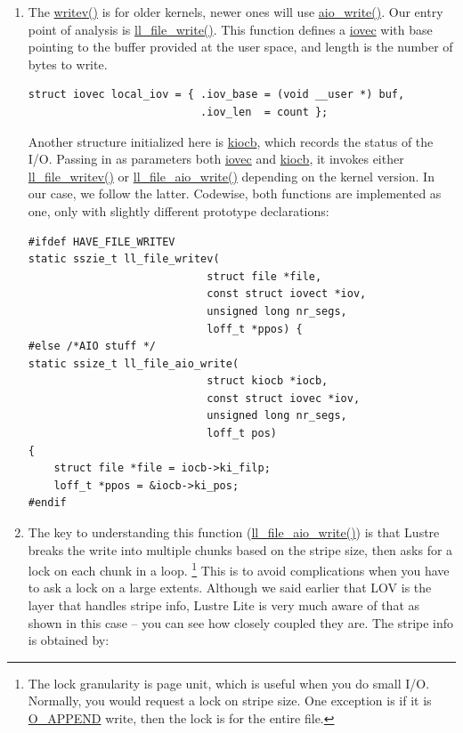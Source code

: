 \begin{enumerate}

\item The \url{writev()} is for older kernels, newer ones will use \url{aio_write()}.
Our entry point of analysis is \url{ll_file_write()}. This function defines a
\url{iovec} with base pointing to the buffer provided at the user space, and length
is the number of bytes to write. 
\begin{Verbatim}
struct iovec local_iov = { .iov_base = (void __user *) buf, 
                           .iov_len  = count };
\end{Verbatim}

Another structure initialized here is \url{kiocb}, which records the status of
the I/O. Passing in as parameters both \url{iovec} and \url{kiocb}, it invokes
either \url{ll_file_writev()} or \url{ll_file_aio_write()} depending on the
kernel version. In our case, we follow the latter. Codewise, both functions
are implemented as one, only with slightly different prototype declarations:

\begin{Verbatim}
#ifdef HAVE_FILE_WRITEV
static sszie_t ll_file_writev( 
                            struct file *file, 
                            const struct iovect *iov,
                            unsigned long nr_segs, 
                            loff_t *ppos) {
#else /*AIO stuff */
static ssize_t ll_file_aio_write(  
                            struct kiocb *iocb,
                            const struct iovec *iov,
                            unsigned long nr_segs,
                            loff_t pos)
{
    struct file *file = iocb->ki_filp;
    loff_t *ppos = &iocb->ki_pos;
#endif 
\end{Verbatim}


\item The key to understanding this function (\url{ll_file_aio_write()}) is
that Lustre breaks the write into multiple chunks based on the stripe size,
then asks for a lock on each chunk in a loop. \footnote{The lock granularity
is page unit, which is useful when you do small I/O. Normally, you would
request a lock on stripe size. One exception is if it is \url{O_APPEND} write,
then the lock is for the entire file.} This is to avoid complications when you
have to ask a lock on a large extents. Although we said earlier that LOV is
the layer that handles stripe info, Lustre Lite is very much aware of that as
shown in this case -- you can see how closely coupled they are. The stripe
info is obtained by: 


\end{enumerate}
